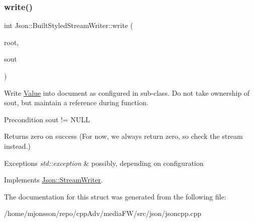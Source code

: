 \subsubsection{\texorpdfstring{write()}{write()}}
{\footnotesize\ttfamily int Json\+::\+Built\+Styled\+Stream\+Writer\+::write (\begin{DoxyParamCaption}\item[{\hyperlink{classJson_1_1Value}{Value} const \&}]{root,  }\item[{J\+S\+O\+N\+C\+P\+P\+\_\+\+O\+S\+T\+R\+E\+AM $\ast$}]{sout }\end{DoxyParamCaption})\hspace{0.3cm}{\ttfamily [virtual]}}

Write \hyperlink{classJson_1_1Value}{Value} into document as configured in sub-\/class. Do not take ownership of sout, but maintain a reference during function. \begin{DoxyPrecond}{Precondition}
sout != N\+U\+LL 
\end{DoxyPrecond}
\begin{DoxyReturn}{Returns}
zero on success (For now, we always return zero, so check the stream instead.) 
\end{DoxyReturn}

\begin{DoxyExceptions}{Exceptions}
{\em std\+::exception} & possibly, depending on configuration \\
\hline
\end{DoxyExceptions}


Implements \hyperlink{classJson_1_1StreamWriter_a84278bad0c9a9fc587bc2a97c5bb5993}{Json\+::\+Stream\+Writer}.



The documentation for this struct was generated from the following file\+:\begin{DoxyCompactItemize}
\item 
/home/mjonsson/repo/cpp\+Adv/media\+F\+W/src/json/jsoncpp.\+cpp\end{DoxyCompactItemize}
